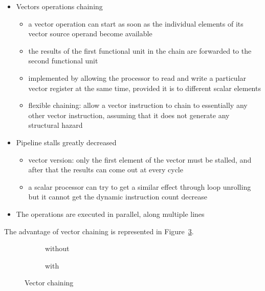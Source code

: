 \documentclass[english]{article}
\begin{document}
\begin{itemize}
  \item Vectors operations chaining
        \begin{itemize}
          \item a vector operation can start as soon as the individual elements of its vector source operand become available
          \item the results of the first functional unit in the chain are forwarded to the second functional unit
          \item implemented by allowing the processor to read and write a particular vector register at the same time, provided it is to different scalar elements
          \item flexible chaining: allow a vector instruction to chain to essentially any other vector instruction, assuming that it does not generate any structural hazard
        \end{itemize}
  \item Pipeline stalls greatly decreased
        \begin{itemize}
          \item vector version: only the first element of the vector must be stalled, and after that the results can come out at every cycle
          \item a scalar processor can try to get a similar effect through loop unrolling but it cannot get the dynamic instruction count decrease
        \end{itemize}
  \item The operations are executed in parallel, along multiple lines
\end{itemize}

\bigskip
The advantage of vector chaining is represented in Figure~\ref{fig:vector-chaining}.

\begin{figure}[htbp]
  \bigskip
  \centering
  \begin{subfigure}[b]{0.495\textwidth}
    \centering
    \caption{without}
    \label{subfig:wihtout-vector-chaining}
  \end{subfigure}
  \begin{subfigure}[b]{0.495\textwidth}
    \centering
    \caption{with}
    \label{subfig:with-vector-chaining}
  \end{subfigure}
  \caption{Vector chaining}
  \label{fig:vector-chaining}
  \bigskip
\end{figure}
\end{document}
